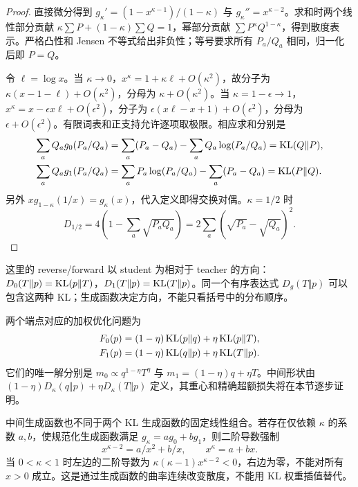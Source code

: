 \begin{proof}
直接微分得到 $g_\kappa'=(1-x^{\kappa-1})/(1-\kappa)$ 与 $g_\kappa''=x^{\kappa-2}$。求和时两个线性部分贡献 $\kappa\sum P+(1-\kappa)\sum Q=1$，幂部分贡献 $\sum P^\kappa Q^{1-\kappa}$，得到散度表示。严格凸性和 Jensen 不等式给出非负性；等号要求所有 $P_a/Q_a$ 相同，归一化后即 $P=Q$。

令 $\ell=\log x$。当 $\kappa\to0$，$x^\kappa=1+\kappa\ell+O(\kappa^2)$，故分子为 $\kappa(x-1-\ell)+O(\kappa^2)$，分母为 $\kappa+O(\kappa^2)$。当 $\kappa=1-\epsilon\to1$，$x^\kappa=x-\epsilon x\ell+O(\epsilon^2)$，分子为 $\epsilon(x\ell-x+1)+O(\epsilon^2)$，分母为 $\epsilon+O(\epsilon^2)$。有限词表和正支持允许逐项取极限。相应求和分别是
\begin{align}
 \sum_aQ_a g_0(P_a/Q_a)
 &=\sum_a(P_a-Q_a)-\sum_aQ_a\log(P_a/Q_a)=\operatorname{KL}(Q\Vert P),\\
 \sum_aQ_a g_1(P_a/Q_a)
 &=\sum_aP_a\log(P_a/Q_a)-\sum_a(P_a-Q_a)=\operatorname{KL}(P\Vert Q).
\end{align}
另外 $xg_{1-\kappa}(1/x)=g_\kappa(x)$，代入定义即得交换对偶。$\kappa=1/2$ 时
\begin{equation}
 D_{1/2}=4\left(1-\sum_a\sqrt{P_aQ_a}\right)
 =2\sum_a(\sqrt{P_a}-\sqrt{Q_a})^2.
\end{equation}
\end{proof}

这里的 reverse/forward 以 student 为相对于 teacher 的方向：$D_0(T\Vert p)=\operatorname{KL}(p\Vert T)$，$D_1(T\Vert p)=\operatorname{KL}(T\Vert p)$。同一个有序表达式 $D_g(T\Vert p)$ 可以包含这两种 KL；生成函数决定方向，不能只看括号中的分布顺序。

两个端点对应的加权优化问题为
\begin{align}
 F_0(p)&=(1-\eta)\operatorname{KL}(p\Vert q)+\eta\operatorname{KL}(p\Vert T),\\
 F_1(p)&=(1-\eta)\operatorname{KL}(q\Vert p)+\eta\operatorname{KL}(T\Vert p).
 \label{eq:divergence-map-barycenter-endpoints}
\end{align}
它们的唯一解分别是 $m_0\propto q^{1-\eta}T^\eta$ 与 $m_1=(1-\eta)q+\eta T$。中间形状由 $(1-\eta)D_\kappa(q\Vert p)+\eta D_\kappa(T\Vert p)$ 定义，其重心和精确超额损失将在本节逐步证明。

中间生成函数也不同于两个 KL 生成函数的固定线性组合。若存在仅依赖 $\kappa$ 的系数 $a,b$，使规范化生成函数满足 $g_\kappa=ag_0+bg_1$，则二阶导数强制
\begin{equation}
 x^{\kappa-2}=a/x^2+b/x,\qquad x^\kappa=a+bx.
\end{equation}
当 $0<\kappa<1$ 时左边的二阶导数为 $\kappa(\kappa-1)x^{\kappa-2}<0$，右边为零，不能对所有 $x>0$ 成立。这是通过生成函数的曲率连续改变散度，不能用 KL 权重插值替代。
